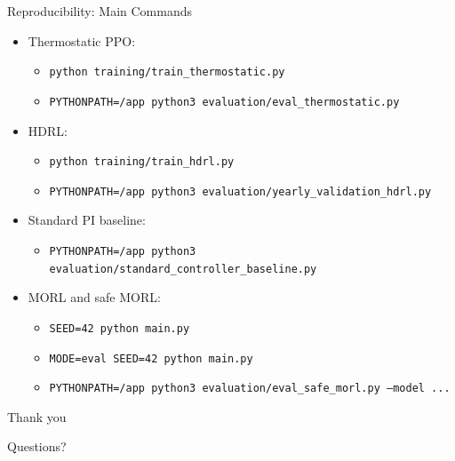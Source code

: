 \documentclass[aspectratio=169,11pt]{beamer}
\begin{document}
\begin{frame}{Reproducibility: Main Commands}
  \small
  \begin{itemize}
    \item Thermostatic PPO:
    \begin{itemize}
      \item \texttt{python training/train\_thermostatic.py}
      \item \texttt{PYTHONPATH=/app python3 evaluation/eval\_thermostatic.py}
    \end{itemize}
    \item HDRL:
    \begin{itemize}
      \item \texttt{python training/train\_hdrl.py}
      \item \texttt{PYTHONPATH=/app python3 evaluation/yearly\_validation\_hdrl.py}
    \end{itemize}
    \item Standard PI baseline:
    \begin{itemize}
      \item \texttt{PYTHONPATH=/app python3 evaluation/standard\_controller\_baseline.py}
    \end{itemize}
    \item MORL and safe MORL:
    \begin{itemize}
      \item \texttt{SEED=42 python main.py}
      \item \texttt{MODE=eval SEED=42 python main.py}
      \item \texttt{PYTHONPATH=/app python3 evaluation/eval\_safe\_morl.py --model ...}
    \end{itemize}
  \end{itemize}
\end{frame}

\begin{frame}
  \centering
  \Large Thank you

  \vspace{1em}
  \normalsize Questions?
\end{frame}
\end{document}
